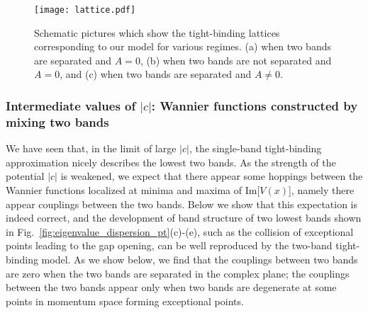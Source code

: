 \documentclass[prb,superscriptaddress,floatfix,twocolumn,showpacs]{revtex4-2}
\begin{document}
\begin{figure}[tbp]
    \centering
    \texttt{[image: lattice.pdf]}
    \caption{Schematic pictures which show the tight-binding lattices corresponding to our model for various regimes.
    (a) when two bands are separated and $A=0$,
    (b) when two bands are not separated and $A = 0$, and (c) when two bands are separated and $A\neq0$. 
    }
    \label{fig:lattice}
\end{figure}

\subsubsection{Intermediate values of $|c|$: Wannier functions constructed by mixing two bands}
\label{subsubsec:intermediate-c}

We have seen that, in the limit of large $|c|$, the single-band tight-binding approximation nicely describes the lowest two bands. As the strength of the potential $|c|$ is weakened, we expect that there appear some hoppings between the Wannier functions localized at minima and maxima of Im[$V(x)$], namely there appear couplings between the two bands.
Below we show that this expectation is indeed correct, and the development of band structure of two lowest bands shown in Fig.~\ref{fig:eigenvalue_dispersion_pt}(c)-(e), such as the collision of exceptional points leading to the gap opening, can be well reproduced by the two-band tight-binding model.
As we show below, we find that the couplings between two bands are zero when the two bands are separated in the complex plane; the couplings between the two bands appear only when two bands are degenerate at some points in momentum space forming exceptional points.
\end{document}
